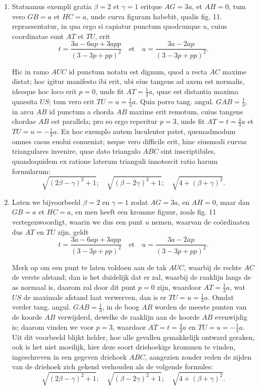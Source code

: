 \documentclass[10pt,a4paper]{article}
\newcommand{\switchenum}{\setcounter{enumi}{\arabic{enumi}-1}\switchcolumn}
\begin{document}
\begin{paracol}{2}
\begin{enumerate}[topsep=1px]
		\item Statuamus exempli gratia $\beta = 2$ et $\gamma = 1$ eritque $AG = 3a$, et $AH = 0$, tum vero $GB = a$ et $HC=a$, unde curva figuram habebit, qualis fig. 11. repraesentatur, in qua ergo si capiatur punctum quodcunque $u$, cuius coordinatae sunt $AT$ et $TU$, erit
		\[
			t = \frac{3a-6ap+3app}{(3-3p+pp)^2} \quad \text{et} \quad u = \frac{3a-2ap}{(3-3p+pp)^2}.
		\]
		\par Hic in ramo $AUC$ id punctum notatu est dignum, quod a recta $AC$ maxime distat; hoc igitur manifesto ibi erit, ubi eius tangens ad axem est normalis, ideoque hoc loco erit $p=0$, unde fit $AT=\frac{1}{3}a$, quae est distantia maxima quaesita $US$; tum vero erit $TU=u=\frac{1}{3}a$. Quia porro tang. angul. $GAB=\frac{1}{3}$, in arcu $AB$ id punctum a chorda $AB$ maxime erit remotum, cuius tangens chordae $AB$ est parallela; pro eo ergo reperitur $p=3$, unde fit $AT= t = \frac{4}{3}a$ et $TU=u=-\frac{1}{3}a$. Ex hoc exemplo autem luculenter patet, quemadmodum omnes casus euolui conueniat; neque vero difficile erit, hinc eiusmodi curvas triangulares invenire, quae dato triangulo $ABC$ sint inscriptibiles, quandoquidem ex ratione laterum trianguli innotescit ratio harum formularum:
		\[
			\sqrt{(2\beta-\gamma)^2+1}; \quad \sqrt{(\beta-2\gamma)^2+1}; \quad  \sqrt{4+(\beta+\gamma)^2}.
		\]
				
		\switchenum
		\item Laten we bijvoorbeeld $\beta = 2$ en $\gamma = 1$ zodat $AG=3a$, en $AH=0$, maar dan $GB = a$ et $HC=a$, en men heeft een kromme figuur, zoals fig. 11 vertegenwoordigt, waarin we dus een punt $u$ nemen, waarvan de coördinaten dus $AT$ en $TU$ zijn, geldt
		\[
			t = \frac{3a-6ap+3app}{(3-3p+pp)^2} \quad \text{et} \quad u = \frac{3a-2ap}{(3-3p+pp)^2}.
		\]
		\par Merk op om een punt te laten voldoen aan de tak $AUC$, waarbij de rechte $AC$ de verste afstand; dan is het duidelijk dat er zal, waarbij de raaklijn langs de as normaal is, daarom zal door dit punt $p=0$ zijn, waardoor $AT=\frac{1}{3}a$, wat $US$ de maximale afstand laat verwerven, dan is er $TU=u=\frac{1}{3}a$. Omdat verder tang. angul. $GAB=\frac{1}{3}$, in de boog $AB$ worden de meeste punten van de koorde $AB$ verwijderd, dewelke de raaklijn aan de koorde $AB$ evenwijdig is; daarom vinden we voor $p=3$, waardoor $AT= t = \frac{4}{3}a$ en $TU=u=-\frac{1}{3}a$. Uit dit voorbeeld blijkt helder, hoe alle gevallen gemakkelijk ontward geraken, ook is het niet moeilijk, hier deze soort driehoekige krommen te vinden, ingeschreven in een gegeven driehoek $ABC$, aangezien zonder reden de zijden van de driehoek zich gekend verhouden als de volgende formules:
		\[
			\sqrt{(2\beta-\gamma)^2+1}; \quad \sqrt{(\beta-2\gamma)^2+1}; \quad  \sqrt{4+(\beta+\gamma)^2}.
		\]
		

\end{enumerate}
\end{paracol}
\end{document}
